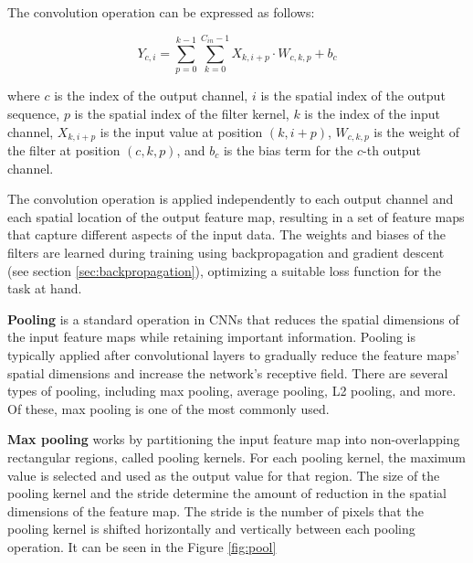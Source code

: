 The convolution operation can be expressed as follows:

\begin{equation}
	Y_{c,i} = \sum_{p=0}^{k-1}\sum_{k=0}^{C_{in}-1} X_{k,i+p} \cdot W_{c,k,p} + b_c
\end{equation}

where $c$ is the index of the output channel, $i$ is the spatial index of the output sequence, $p$ is the spatial index of the filter kernel, $k$ is the index of the input channel, $X_{k,i+p}$ is the input value at position $(k,i+p)$, $W_{c,k,p}$ is the weight of the filter at position $(c,k,p)$, and $b_c$ is the bias term for the $c$-th output channel.

The convolution operation is applied independently to each output channel and each spatial location of the output feature map, resulting in a set of feature maps that capture different aspects of the input data. The weights and biases of the filters are learned during training using backpropagation and gradient descent (see section \ref{sec:backpropagation}), optimizing a suitable loss function for the task at hand.


\label{sec:pooling}

\textbf{Pooling} is a standard operation in \acp{CNN} that reduces the spatial dimensions of the input feature maps while retaining important information. Pooling is typically applied after convolutional layers to gradually reduce the feature maps' spatial dimensions and increase the network's receptive field. There are several types of pooling, including max pooling, average pooling, L2 pooling, and more. Of these, max pooling is one of the most commonly used.

\textbf{Max pooling} works by partitioning the input feature map into non-overlapping rectangular regions, called pooling kernels. For each pooling kernel, the maximum value is selected and used as the output value for that region. The size of the pooling kernel and the stride determine the amount of reduction in the spatial dimensions of the feature map. The stride is the number of pixels that the pooling kernel is shifted horizontally and vertically between each pooling operation. It can be seen in the Figure \ref{fig:pool}

